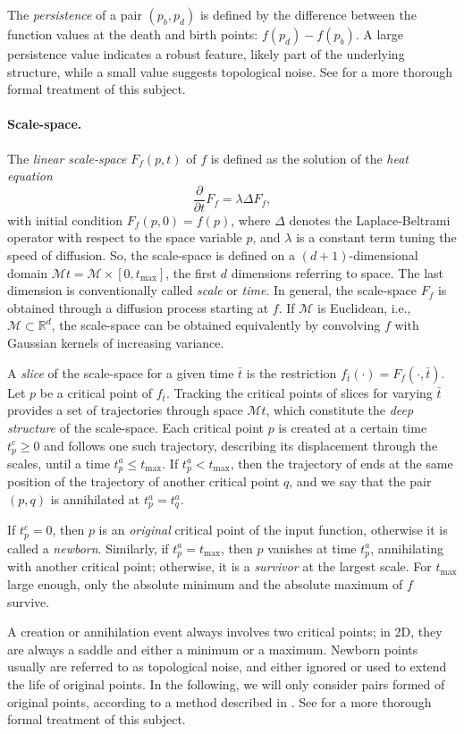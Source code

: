 The \emph{persistence} of a pair $(p_b,p_d)$ is defined by the difference between the function values at the death and birth points: $f(p_d)-f(p_b)$.
A large persistence value indicates a robust feature, likely part of the underlying structure, while a small value suggests topological noise.
See \cite{Edelsbrunner:2010} for a more thorough formal treatment of this subject. 

 
\paragraph*{Scale-space.}
The \emph{linear scale-space} $F_f(p,t)$ of $f$ is defined as the solution of the \emph{heat equation} 
\[\frac{\partial}{\partial t} F_f = \lambda \Delta F_f,\]
with initial condition $F_f(p,0)=f(p)$, where $\Delta$ denotes the Laplace-Beltrami operator with respect to the space variable $p$, and $\lambda$ is a constant term tuning the speed of diffusion.
So, the scale-space is defined on a $(d+1)$-dimensional domain ${\mathcal M}t={\mathcal M}\times [0,t_{\max}]$, the first $d$ dimensions referring to space. 
The last dimension is conventionally called \emph{scale} or \emph{time}.
In general, the scale-space $F_f$ is obtained through a diffusion process starting at $f$.
If ${\mathcal M}$ is Euclidean, i.e., ${\mathcal M}\subset\mathbb{R}^d$, the scale-space can be obtained equivalently by convolving $f$ with Gaussian kernels of increasing variance. 

A \emph{slice} of the scale-space for a given time $\bar{t}$ is the restriction $f_{\bar t}(\cdot)=F_f(\cdot,\bar t)$.
Let $p$ be a critical point of $f_{\bar t}$.
Tracking the critical points of slices for varying $\bar t$ provides a set of trajectories through space ${\mathcal M}t$, which constitute the \emph{deep structure} of the scale-space.
Each critical point $p$ is created at a certain time $t^c_p\geq 0$ and follows one such trajectory, describing its displacement through the scales, until a time $t^a_p\leq t_{\max}$.  
If $t^a_p<t_{\max}$, then the trajectory of ends at the same position of the trajectory of another critical point $q$, and we say that the pair $(p,q)$ is annihilated at $t^a_p=t^a_q$. 

If $t^c_p=0$, then $p$ is an \emph{original} critical point of the input function, otherwise it is called a \emph{newborn}. 
Similarly, if $t^a_p=t_{\max}$, then $p$ vanishes at time $t^a_p$, annihilating with another critical point; otherwise, it is a \emph{survivor} at the largest scale.
For $t_{\max}$ large enough, only the absolute minimum and the absolute maximum of $f$ survive. 

A creation or annihilation event always involves two critical points; in 2D, they are always a saddle and either a minimum or a maximum.
Newborn points usually are referred to as topological noise, and either ignored or used to extend the life of original points.
In the following, we will only consider pairs formed of original points, according to a method described in \cite{Rocca:2013}. 
See \cite{Florack:2000wg} for a more thorough formal treatment of this subject. 



